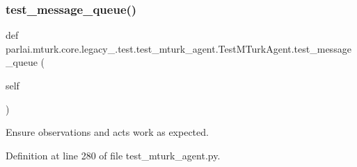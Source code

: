 \subsubsection{\texorpdfstring{test\+\_\+message\+\_\+queue()}{test\_message\_queue()}}
{\footnotesize\ttfamily def parlai.\+mturk.\+core.\+legacy\+\_.\+test.\+test\+\_\+mturk\+\_\+agent.\+Test\+M\+Turk\+Agent.\+test\+\_\+message\+\_\+queue (\begin{DoxyParamCaption}\item[{}]{self }\end{DoxyParamCaption})}

\begin{DoxyVerb}Ensure observations and acts work as expected.
\end{DoxyVerb}
 

Definition at line 280 of file test\+\_\+mturk\+\_\+agent.\+py.


